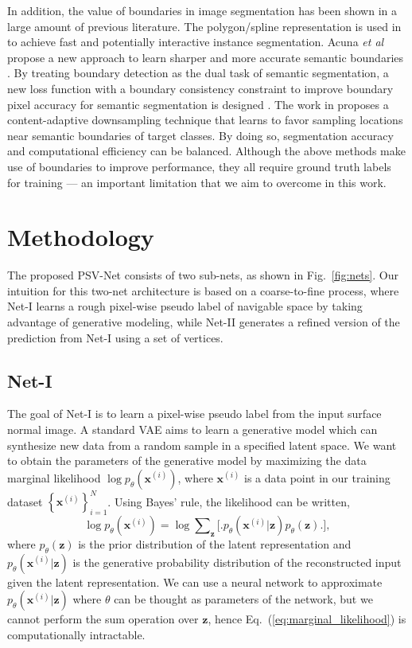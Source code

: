 \documentclass[letterpaper, 10 pt, journal, twoside]{ieeetran}
\begin{document}
In addition, the value of boundaries in image segmentation has been shown in a large amount of previous literature. The  polygon/spline representation is used in \cite{castrejon2017annotating, acuna2018efficient, ling2019fast, peng2020deep, Liang_2020_CVPR} to achieve fast and potentially interactive instance segmentation. Acuna {\em et al} propose a new approach to learn sharper and more accurate semantic boundaries \cite{acuna2019Steal}. By treating  boundary detection as the dual task of semantic segmentation, a new loss function with a boundary consistency constraint to improve boundary pixel accuracy for semantic segmentation is designed \cite{Zhen_2020_CVPR}. The work in \cite{Marin_2019_ICCV} proposes a content-adaptive downsampling technique that learns to favor sampling locations near semantic boundaries of target classes. By doing so, segmentation accuracy and computational efficiency can be balanced. Although the above methods make use of boundaries to improve  performance, they all require ground truth labels for training --- an important limitation that we aim to overcome in this work. 

\section{Methodology}

The proposed PSV-Net consists of two sub-nets, as shown in Fig.~\ref{fig:nets}. Our intuition for this two-net architecture is based on a coarse-to-fine process, where Net-I learns a rough pixel-wise pseudo label of navigable space by taking advantage of generative modeling, while Net-II generates a refined version of the prediction from Net-I using a set of vertices.


\subsection{Net-I}
The goal of Net-I is to learn a pixel-wise pseudo label from the input surface normal image.
A standard VAE aims to learn a generative model which can synthesize new data from a random sample in a specified latent space. We want to obtain the parameters of the generative model by maximizing the data marginal likelihood $\log p_{\theta}(\mathbf{x}^{(i)})$, where $\mathbf{x}^{(i)}$ is a data point in our training dataset $\left \{ \mathbf{x}^{(i)} \right \}_{i=1}^N$. Using Bayes' rule, the likelihood can be written,
\begin{equation}
\label{eq:marginal_likelihood}
    \log p_{\theta}(\mathbf{x}^{(i)}) = \log \sum\nolimits_{\mathbf{z}} \Bigg[ \Bigg. p_{\theta}(\mathbf{x}^{(i)}|\mathbf{z})p_{\theta}(\mathbf{z})\Bigg. \Bigg],
\end{equation}
where $p_{\theta}(\mathbf{z})$ is the prior distribution of the latent representation and $p_{\theta}(\mathbf{x}^{(i)}|\mathbf{z})$ is the generative probability distribution of the
reconstructed input given the latent representation. We can use a neural network to approximate $p_{\theta}(\mathbf{x}^{(i)}|\mathbf{z})$ where $\theta$ can be thought as parameters of the network, but we cannot perform the sum operation over $\mathbf{z}$, hence Eq.~(\ref{eq:marginal_likelihood}) is computationally intractable. 
\end{document}
